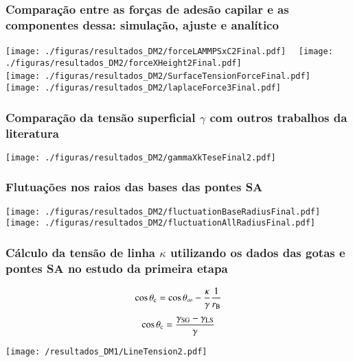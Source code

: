 \documentclass[8pt]{beamer}
\begin{document}
\begin{frame}
\frametitle{Comparação entre as forças de adesão capilar e as componentes dessa: simulação, ajuste e analítico}
	\begin{center}
		\texttt{[image: ./figuras/resultados\_DM2/forceLAMMPSxC2Final.pdf]}~~   
		\texttt{[image: ./figuras/resultados\_DM2/forceXHeight2Final.pdf]}\\
		\texttt{[image: ./figuras/resultados\_DM2/SurfaceTensionForceFinal.pdf]}~~
		\texttt{[image: ./figuras/resultados\_DM2/laplaceForce3Final.pdf]}\\
	\end{center}
\end{frame}


\begin{frame}
\frametitle{Comparação da tensão superficial $\gamma$ com outros trabalhos da literatura}
		\texttt{[image: ./figuras/resultados\_DM2/gammaXkTeseFinal2.pdf]}   
\end{frame}

\begin{frame}
	\frametitle{Flutuações nos raios das bases das pontes SA}
		\texttt{[image: ./figuras/resultados\_DM2/fluctuationBaseRadiusFinal.pdf]}
		\texttt{[image: ./figuras/resultados\_DM2/fluctuationAllRadiusFinal.pdf]}
\end{frame}

\begin{frame}
\frametitle{Cálculo da tensão de linha $\kappa$ utilizando os dados das gotas e pontes SA no estudo da {\bf primeira etapa}}
		$$\cos\theta_{\rm c} = \cos\theta_{\rm \infty} - \frac{\kappa}{\gamma}\frac{1}{r_{\rm B}}$$
		$$\cos\theta_{\rm c} = \frac{\gamma_{\rm SG} - \gamma_{\rm LS}}{\gamma}$$ 
		\begin{center}
			\texttt{[image: /resultados\_DM1/LineTension2.pdf]}
		\end{center}	
\end{frame}
\end{document}
